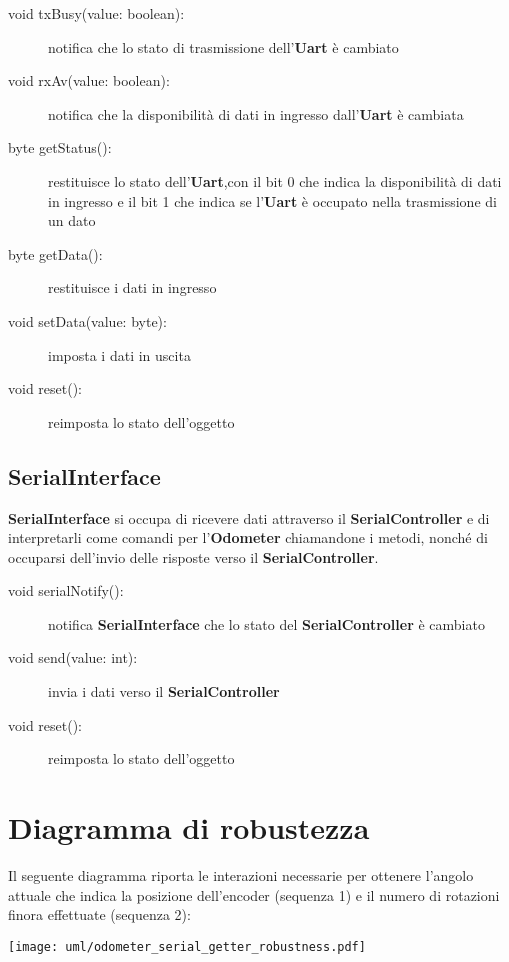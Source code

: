 \documentclass [11pt,a4paper,oneside]{paper}
\newcommand{\component}[1]{\textbf{#1}}
\begin{document}
\begin{description}
\item[void txBusy(value: boolean):] notifica che lo stato di trasmissione
    dell'\component{Uart} è cambiato
\item[void rxAv(value: boolean):] notifica che la disponibilità di dati
    in ingresso dall'\component{Uart} è cambiata
\item[byte getStatus():] restituisce lo stato dell'\component{Uart},con il
    bit 0 che indica la disponibilità di dati in ingresso e il bit 1 che
    indica se l'\component{Uart} è occupato nella trasmissione di un dato
\item[byte getData():] restituisce i dati in ingresso
\item[void setData(value: byte):] imposta i dati in uscita
\item[void reset():] reimposta lo stato dell'oggetto
\end{description}

\subsection{SerialInterface}
\component{SerialInterface} si occupa di ricevere dati attraverso il
\component{SerialController} e di interpretarli come comandi per
l'\component{Odometer} chiamandone i metodi, nonché di occuparsi
dell'invio delle risposte verso il \component{SerialController}.

\begin{description}
\item[void serialNotify():] notifica \component{SerialInterface} che
    lo stato del \component{SerialController} è cambiato
\item[void send(value: int):] invia i dati verso il
    \component{SerialController}
\item[void reset():] reimposta lo stato dell'oggetto
\end{description}

\section{Diagramma di robustezza}
Il seguente diagramma riporta le interazioni necessarie per ottenere
l'angolo attuale che indica la posizione dell'encoder (sequenza 1) e
il numero di rotazioni finora effettuate (sequenza 2):
\begin{center}
    \texttt{[image: uml/odometer\_serial\_getter\_robustness.pdf]}
    \label{serial_getter_robustness}
\end{center}
\end{document}
